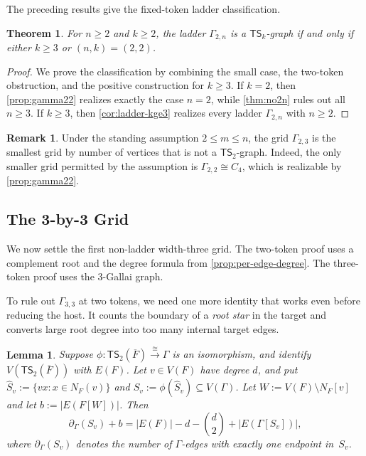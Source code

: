 \documentclass[a4paper]{article}
\theoremstyle{plain}
\newtheorem{theorem}{Theorem}[section]
\newtheorem{lemma}[lemma]{Lemma}
\theoremstyle{definition}
\newtheorem{remark}[remark]{Remark}
\newcommand{\TSsym}{\mathsf{TS}}
\numberwithin{equation}{section}
\begin{document}
The preceding results give the fixed-token ladder classification.

\begin{theorem}
\label{thm:ladder-bounds}
For $n\ge 2$ and $k\ge 2$, the ladder $\Gamma_{2,n}$ is a $\TSsym_k$-graph if and only if either $k\ge 3$ or $(n,k)=(2,2)$.
\end{theorem}

\begin{proof}
We prove the classification by combining the small case, the two-token obstruction, and the positive construction for $k\ge 3$.
If $k=2$, then \cref{prop:gamma22} realizes exactly the case $n=2$, while \cref{thm:no2n} rules out all $n\ge 3$.
If $k\ge 3$, then \cref{cor:ladder-kge3} realizes every ladder $\Gamma_{2,n}$ with $n\ge 2$.
\end{proof}

\begin{remark}
\label{rem:smallest-non-ts2-grid}
Under the standing assumption $2\le m\le n$, the grid $\Gamma_{2,3}$ is the smallest grid by number of vertices that is not a $\TSsym_2$-graph.
Indeed, the only smaller grid permitted by the assumption is $\Gamma_{2,2}\cong C_4$, which is realizable by \cref{prop:gamma22}.
\end{remark}

\subsection{The 3-by-3 Grid}
\label{subsec:gamma33}

We now settle the first non-ladder width-three grid.
The two-token proof uses a complement root and the degree formula from \cref{prop:per-edge-degree}.
The three-token proof uses the $3$-Gallai graph.

To rule out $\Gamma_{3,3}$ at two tokens, we need one more identity that works even before reducing the host.
It counts the boundary of a \emph{root star} in the target and converts large root degree into too many internal target edges.

\begin{lemma}
\label{lem:star-set-identity}
Suppose $\phi:\TSsym_2(\overline{F})\xrightarrow{\cong} \Gamma$ is an isomorphism, and identify $V(\TSsym_2(\overline{F}))$ with $E(F)$.
Let $v\in V(F)$ have degree $d$, and put $\widehat S_v:=\{vx:x\in N_F(v)\}$ and $S_v:=\phi(\widehat S_v)\subseteq V(\Gamma)$.
Let $W:=V(F)\setminus N_F[v]$ and let $b:=|E(F[W])|$.
Then
\[
\partial_\Gamma(S_v)+b=|E(F)|-d-\binom d2+|E(\Gamma[S_v])|,
\]
where $\partial_\Gamma(S_v)$ denotes the number of $\Gamma$-edges with exactly one endpoint in~$S_v$.
\end{lemma}
\end{document}
